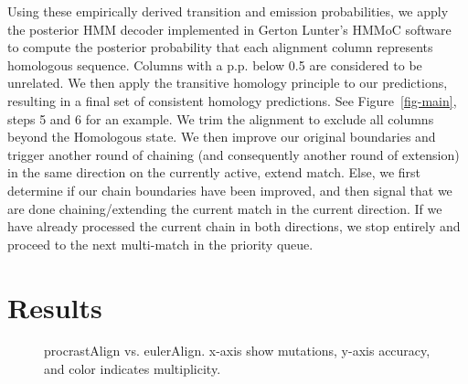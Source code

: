 \documentclass{ws-procs975x65}
\begin{document}
Using these empirically derived transition and emission probabilities, we apply the posterior HMM decoder implemented in Gerton Lunter's HMMoC software~\cite{hmmoc} to compute the posterior probability that each alignment column represents homologous sequence.  Columns with a p.p. below 0.5 are considered to be unrelated.  We then apply the transitive homology principle to our predictions, resulting in a final set of consistent homology predictions.  See Figure~\ref{fig-main}, steps 5 and 6 for an example. We trim the alignment to exclude all columns beyond the Homologous state. We then improve our original boundaries and trigger another round of chaining (and consequently another round of extension) in the same direction on the currently active, extend match. Else, we first determine if our chain boundaries have been improved, and then signal that we are done chaining/extending the current match in the current direction. If we have already processed the current chain in both directions, we stop entirely and proceed to the next multi-match in the priority queue.


\section{Results}
\begin{figure}[t]
\centering {}
\caption{ procrastAlign vs. eulerAlign. x-axis show mutations, y-axis accuracy, and color indicates multiplicity.}
\label{fig-results}\vspace{-0.2cm}
\end{figure}


%
%
\end{document}
